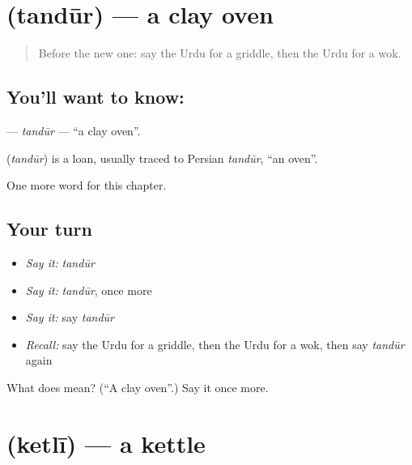 \section[\texorpdfstring{\ur{تندور} (tandūr)}{تندور (tandūr)}]{ (tandūr) — a clay oven}

\label{lesson:UR-C250-tandur}



\begin{quote}
Before the new one: say the Urdu for a griddle, then the Urdu for a wok.
\end{quote}

\subsection*{You'll want to know: }
\textbf{} — \emph{tandūr} — \textquotedblleft{}a clay oven\textquotedblright{}.

\begin{cousinweb}
\textbf{} (\emph{tandūr}) is a loan, usually traced to Persian \emph{tandūr}, \textquotedblleft{}an oven\textquotedblright{}.
\end{cousinweb}

\begin{grammarlens}[title={What you've built}]
One more word for this chapter.
\end{grammarlens}

\subsection*{Your turn}
\begin{itemize}
\raggedright
  \item \emph{Say it:} \emph{tandūr}
  \item \emph{Say it:} \emph{tandūr}, once more
  \item \emph{Say it:} say \emph{tandūr}
  \item \emph{Recall:} say the Urdu for a griddle, then the Urdu for a wok, then say \emph{tandūr} again
\end{itemize}

\begin{tcolorbox}[breakable,colback=teal!4,colframe=teal!35!black,title={Before you move on}]
What does  mean? (\textquotedblleft{}A clay oven\textquotedblright{}.) Say it once more.
\end{tcolorbox}
\section[\texorpdfstring{\ur{کیتلی} (ketlī)}{کیتلی (ketlī)}]{ (ketlī) — a kettle}

